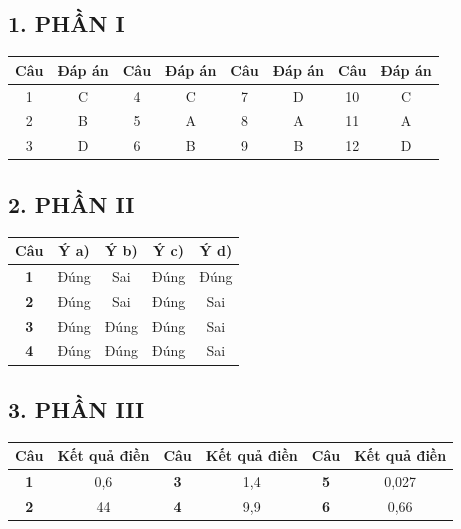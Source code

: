 \documentclass[12pt,a4paper]{article}
\begin{document}
\subsection*{1. PHẦN I}
\begin{center}
\begin{tabular}{|c|c||c|c||c|c||c|c|}
\hline
\textbf{Câu} & \textbf{Đáp án} & \textbf{Câu} & \textbf{Đáp án} & \textbf{Câu} & \textbf{Đáp án} & \textbf{Câu} & \textbf{Đáp án} \\ \hline
1 & C & 4 & C & 7 & D & 10 & C \\ \hline
2 & B & 5 & A & 8 & A & 11 & A \\ \hline
3 & D & 6 & B & 9 & B & 12 & D \\ \hline
\end{tabular}
\end{center}

\subsection*{2. PHẦN II}
\begin{center}
\begin{tabular}{|c|c|c|c|c|}
\hline
\textbf{Câu} & \textbf{Ý a)} & \textbf{Ý b)} & \textbf{Ý c)} & \textbf{Ý d)} \\ \hline
\textbf{1} & Đúng & Sai & Đúng & Đúng \\ \hline
\textbf{2} & Đúng & Sai & Đúng & Sai \\ \hline
\textbf{3} & Đúng & Đúng & Đúng & Sai \\ \hline
\textbf{4} & Đúng & Đúng & Đúng & Sai \\ \hline
\end{tabular}
\end{center}

\subsection*{3. PHẦN III}
\begin{center}
\begin{tabular}{|c|c||c|c||c|c|}
\hline
\textbf{Câu} & \textbf{Kết quả điền} & \textbf{Câu} & \textbf{Kết quả điền} & \textbf{Câu} & \textbf{Kết quả điền} \\ \hline
\textbf{1} & 0,6 & \textbf{3} & 1,4 & \textbf{5} & 0,027 \\ \hline
\textbf{2} & 44 & \textbf{4} & 9,9 & \textbf{6} & 0,66 \\ \hline
\end{tabular}
\end{center}
\end{document}
